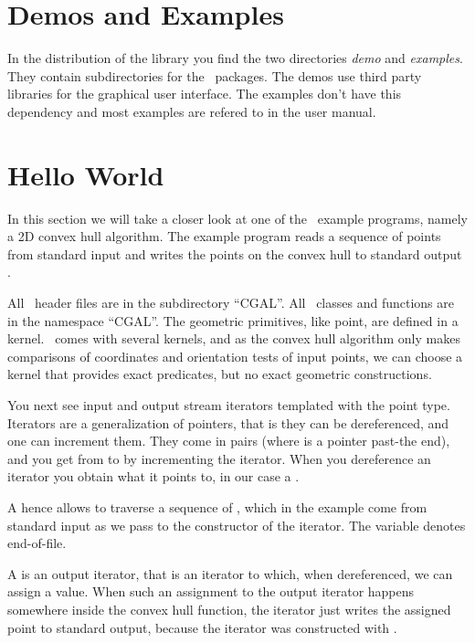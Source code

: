 \section{Demos and Examples}

In the distribution of the library  you find the two directories {\em demo}
and {\em examples}. They contain subdirectories for the \cgal\ packages.  
The demos use third party libraries for the graphical user interface. The 
examples don't have this dependency and most examples are refered to in the 
user manual.



\section{Hello World}

In this section we will take a closer look at one of the \cgal\ example
programs, namely a 2D convex hull algorithm. The example program reads 
a sequence of points from standard input  and writes the 
points on the  convex hull to standard output .



All \cgal\ header files are in the subdirectory ``CGAL''.  All \cgal\ 
classes and functions are in the namespace ``CGAL''.  The geometric
primitives, like point, are defined in a kernel. \cgal\ comes
with several kernels, and as the convex hull algorithm only makes
comparisons of coordinates and orientation tests of input points,
we can choose a kernel that provides exact predicates, but no 
exact geometric constructions.

You next see input and output stream iterators templated with the 
point type.  Iterators are a generalization of pointers, that is
they can be dereferenced, and one can increment them.  They
come in  pairs (where  is a pointer 
past-the end), and you get from  to \ccc{end} by 
incrementing the iterator. When you dereference an iterator you 
obtain what it points to, in our case a \ccc{Point_2}. 

A   hence allows to traverse
a sequence of \ccc{Points}, which in the example come from
standard input as we pass  to the constructor
of the iterator. The variable  denotes end-of-file.

A  is an output iterator,
that is an iterator to which, when dereferenced, we can assign a value. 
When such an assignment to the output iterator
happens somewhere inside the convex hull function, the iterator 
just writes the assigned point to standard output, because the iterator 
was  constructed with \ccc{std::cout}.

